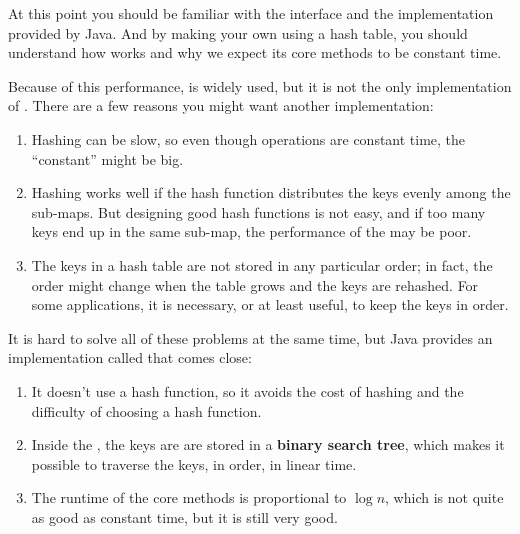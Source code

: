 \documentclass[12pt]{book}
\theoremstyle{exercise}
\begin{document}
At this point you should be familiar with the  interface and
the  implementation provided by Java. And by making your
own  using a hash table, you should understand how
 works and why we expect its core methods to be constant
time.


Because of this performance,  is widely used, but it is
not the only implementation of . There are a few reasons you
might want another implementation:

\begin{enumerate}

\item
  Hashing can be slow, so even though  operations are
  constant time, the ``constant'' might be big.

\item
  Hashing works well if the hash function distributes the keys evenly
  among the sub-maps.  But designing good hash functions is not easy,
  and if too many keys end up in the same sub-map, the performance of
  the  may be poor.

\item
  The keys in a hash table are not stored in any particular order; in
  fact, the order might change when the table grows and the keys are
  rehashed. For some applications, it is necessary, or at least useful,
  to keep the keys in order.

\end{enumerate}

It is hard to solve all of these problems at the same
time, but Java provides an implementation called  that
comes close:

\begin{enumerate}

\item
  It doesn't use a hash function, so it avoids the cost of hashing
  and the difficulty of choosing a hash function.

\item
  Inside the , the keys are are stored in a
  \textbf{binary search tree}, which makes it possible to traverse the
  keys, in order, in linear time.

\item
  The runtime of the core methods is proportional to $\log n$,
  which is not quite as good as constant time, but it is still
  very good.

\end{enumerate}
\end{document}
